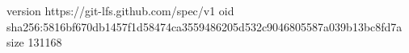 version https://git-lfs.github.com/spec/v1
oid sha256:5816bf670db1457f1d58474ca3559486205d532c9046805587a039b13bc8fd7a
size 131168
